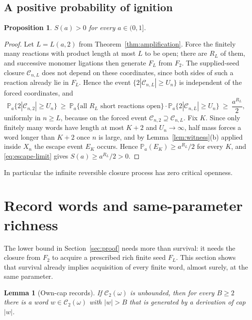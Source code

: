 \documentclass[11pt,reqno]{amsart}
\theoremstyle{plain}
\newtheorem{lemma}[theorem]{Lemma}
\newtheorem{proposition}[theorem]{Proposition}
\theoremstyle{definition}
\theoremstyle{remark}
\numberwithin{equation}{section}
\newcommand{\Prob}{\mathbb{P}}
\newcommand{\cC}{\mathcal{C}}
\begin{document}
\subsection{A positive probability of ignition}

\begin{proposition}\label{prop:positivity}
$S(a)>0$ for every $a\in(0,1]$.
\end{proposition}

\begin{proof}
Let $L=L(a,2)$ from Theorem~\ref{thm:amplification}. Force the finitely many reactions with product length at most $L$ to be open; there are $R_L$ of them, and successive monomer ligations then generate $F_L$ from $F_2$. The supplied-seed closure $\cC_{n,L}$ does not depend on these coordinates, since both sides of such a reaction already lie in $F_L$. Hence the event $\{2|\cC_{n,L}|\ge U_n\}$ is independent of the forced coordinates, and
\[
\Prob_a\bigl\{2|\cC_{n,2}|\ge U_n\bigr\}\ \ge\ \Prob_a\bigl\{\text{all }R_L\text{ short reactions open}\bigr\}\cdot\Prob_a\bigl\{2|\cC_{n,L}|\ge U_n\bigr\}\ \ge\ \frac{a^{R_L}}{2},
\]
uniformly in $n\ge L$, because on the forced event $\cC_{n,2}\supseteq\cC_{n,L}$. Fix $K$. Since only finitely many words have length at most $K+2$ and $U_n\to\infty$, half mass forces a word longer than $K+2$ once $n$ is large, and by Lemma~\ref{lem:witness}(b) applied inside $X_n$ the escape event $E_K$ occurs. Hence $\Prob_a(E_K)\ge a^{R_L}/2$ for every $K$, and \eqref{eq:escape-limit} gives $S(a)\ge a^{R_L}/2>0$.
\end{proof}

In particular the infinite reversible closure process has zero critical openness.

\section{Record words and same-parameter richness}\label{sec:richness}

The lower bound in Section~\ref{sec:proof} needs more than survival: it needs the closure from $F_2$ to acquire a prescribed rich finite seed $F_L$. This section shows that survival already implies acquisition of every finite word, almost surely, at the same parameter.

\begin{lemma}[Own-cap records]\label{lem:records}
If $\cC_2(\omega)$ is unbounded, then for every $B\ge2$ there is a word $w\in\cC_2(\omega)$ with $|w|>B$ that is generated by a derivation of cap $|w|$.
\end{lemma}
\end{document}

